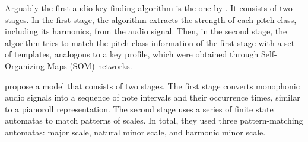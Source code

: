 


Arguably the first audio key-finding algorithm is the one by
\textcite{leman1992een}. It consists of two stages. In the
first stage, the algorithm extracts the strength of each
pitch-class, including its harmonics, from the audio signal.
Then, in the second stage, the algorithm tries to match the
pitch-class information of the first stage with a set of
templates, analogous to a key profile, which were obtained
through Self-Organizing Maps (SOM) networks.


\textcite{izmirli1994recognition} propose a model that
consists of two stages. The first stage converts monophonic
audio signals into a sequence of note intervals and their
occurrence times, similar to a pianoroll representation. The
second stage uses a series of finite state automatas to
match patterns of scales. In total, they used three
pattern-matching automatas: major scale, natural minor
scale, and harmonic minor scale.

